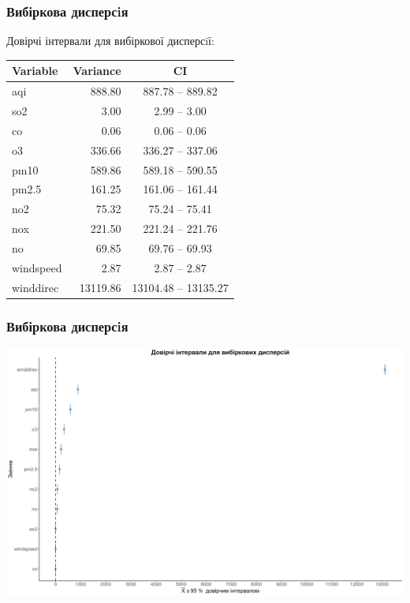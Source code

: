 \documentclass{beamer}
\begin{document}
\begin{frame}
  \frametitle{Вибіркова дисперсiя}

  Довірчі інтервали для вибіркової дисперсiї:

  \begin{table}[ht]
    \centering
    \begin{tabular}{lrc}
      \hline
      Variable  & Variance & CI \\ 
      \hline
      aqi       & 888.80   & 887.78   -- 889.82   \\ 
      so2       & 3.00     & 2.99     -- 3.00     \\ 
      co        & 0.06     & 0.06     -- 0.06     \\ 
      o3        & 336.66   & 336.27   -- 337.06   \\ 
      pm10      & 589.86   & 589.18   -- 590.55   \\ 
      pm2.5     & 161.25   & 161.06   -- 161.44   \\ 
      no2       & 75.32    & 75.24    -- 75.41    \\ 
      nox       & 221.50   & 221.24   -- 221.76   \\ 
      no        & 69.85    & 69.76    -- 69.93    \\ 
      windspeed & 2.87     & 2.87     -- 2.87     \\ 
      winddirec & 13119.86 & 13104.48 -- 13135.27 \\ 
       \hline
    \end{tabular}
  \end{table}
\end{frame}

\begin{frame}
  \frametitle{Вибіркова дисперсiя}

  \begin{center}
    \includegraphics[width=\linewidth]{./plots/lab2/1-4-part/ci-var.png}
  \end{center}
  
\end{frame}
\end{document}
